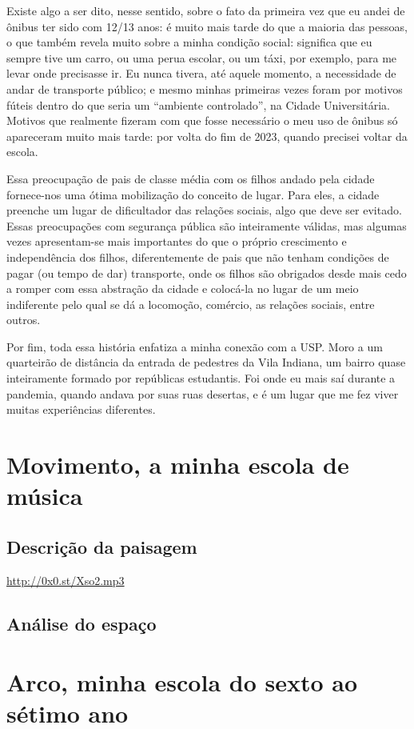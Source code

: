 \documentclass[12pt]{article}
\begin{document}
Existe algo a ser dito, nesse sentido, sobre o fato da primeira vez que eu andei de ônibus ter sido com 12/13 anos: é muito mais tarde do que a maioria das pessoas, o que também revela muito sobre a minha condição social: significa que eu sempre tive um carro, ou uma perua escolar, ou um táxi, por exemplo, para me levar onde precisasse ir. Eu nunca tivera, até aquele momento, a necessidade de andar de transporte público; e mesmo minhas primeiras vezes foram por motivos fúteis dentro do que seria um ``ambiente controlado'', na Cidade Universitária. Motivos que realmente fizeram com que fosse necessário o meu uso de ônibus só apareceram muito mais tarde: por volta do fim de 2023, quando precisei voltar da escola.

Essa preocupação de pais de classe média com os filhos andado pela cidade fornece-nos uma ótima mobilização do conceito de lugar. Para eles, a cidade preenche um lugar de dificultador das relações sociais, algo que deve ser evitado. Essas preocupações com segurança pública são inteiramente válidas, mas algumas vezes apresentam-se mais importantes do que o próprio crescimento e independência dos filhos, diferentemente de pais que não tenham condições de pagar (ou tempo de dar) transporte, onde os filhos são obrigados desde mais cedo a romper com essa abstração da cidade e colocá-la no lugar de um meio indiferente pelo qual se dá a locomoção, comércio, as relações sociais, entre outros.

Por fim, toda essa história enfatiza a minha conexão com a USP. Moro a um quarteirão de distância da entrada de pedestres da Vila Indiana, um bairro quase inteiramente formado por repúblicas estudantis. Foi onde eu mais saí durante a pandemia, quando andava por suas ruas desertas, e é um lugar que me fez viver muitas experiências diferentes. 

\section{Movimento, a minha escola de música}
\subsection{Descrição da paisagem}
\url{http://0x0.st/Xso2.mp3}
\subsection{Análise do espaço}


\section{Arco, minha escola do sexto ao sétimo ano}
\end{document}

